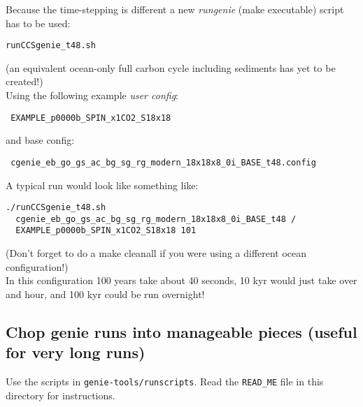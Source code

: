 \documentclass[10pt,twoside]{article}
\begin{document}
Because the time-stepping is different a new \textit{rungenie} (make executable) script has to be used:
\vspace{-5.5pt}\begin{verbatim}
runCCSgenie_t48.sh
\end{verbatim}\vspace{-16.5pt}
  (an equivalent ocean-only full carbon cycle including sediments has yet to be created!)
\\
Using the following example \textit{user config}:
        \vspace{-5.5pt}\begin{verbatim}
 EXAMPLE_p0000b_SPIN_x1CO2_S18x18
  \end{verbatim}\vspace{-16.5pt}
                and base config:
 \vspace{-5.5pt}\begin{verbatim}
 cgenie_eb_go_gs_ac_bg_sg_rg_modern_18x18x8_0i_BASE_t48.config
  \end{verbatim}\vspace{-16.5pt}
                A typical run would look like something like:
      \vspace{-5.5pt}\begin{verbatim}
./runCCSgenie_t48.sh
  cgenie_eb_go_gs_ac_bg_sg_rg_modern_18x18x8_0i_BASE_t48 /
  EXAMPLE_p0000b_SPIN_x1CO2_S18x18 101
 \end{verbatim}\vspace{-16.5pt}
                (Don't forget to do a make cleanall if you were using a different ocean configuration!)
\\
In this configuration 100 years take about 40 seconds, 10 kyr would just take over and hour, and 100 kyr could be run overnight!



\subsection{Chop genie runs into manageable pieces (useful for very long runs)}\label{Chop genie runs into manageable pieces (useful for very long runs)}

Use the scripts in \texttt{genie-tools/runscripts}. Read the \texttt{READ\_ME} file in this directory for instructions.

\end{document}
